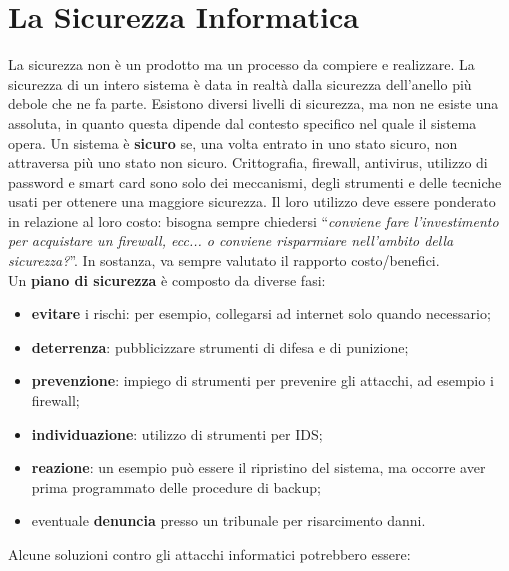\section{La Sicurezza Informatica}

La sicurezza non è un prodotto ma un processo da compiere e realizzare.
La sicurezza di un intero sistema è data in realtà dalla sicurezza dell'anello
più debole che ne fa parte. Esistono diversi livelli di sicurezza, ma non ne
esiste una assoluta, in quanto questa dipende dal contesto specifico nel quale
il sistema opera.
Un sistema è \textbf{sicuro} se, una volta entrato in uno stato sicuro, non
attraversa più uno stato non sicuro.
Crittografia, firewall, antivirus, utilizzo di password e smart card sono solo
dei meccanismi, degli strumenti e delle tecniche usati per ottenere una maggiore
sicurezza. Il loro utilizzo deve essere ponderato in relazione al loro costo:
bisogna sempre chiedersi ``\textit{conviene fare l'investimento per acquistare un firewall,
      ecc... o conviene risparmiare nell'ambito della sicurezza?}''. In sostanza, va
sempre valutato il rapporto costo/benefici.\\

Un \textbf{piano di sicurezza} è composto da diverse fasi:

\begin{itemize}
      \item \textbf{evitare} i rischi: per esempio, collegarsi ad internet
            solo quando necessario;
      \item \textbf{deterrenza}: pubblicizzare strumenti di difesa e di punizione;
      \item \textbf{prevenzione}: impiego di strumenti per prevenire gli attacchi,
            ad esempio i firewall;
      \item \textbf{individuazione}: utilizzo di strumenti per IDS;
      \item \textbf{reazione}: un esempio può essere il ripristino del sistema,
            ma occorre aver prima programmato delle procedure di backup;
      \item eventuale \textbf{denuncia} presso un tribunale per risarcimento danni.
\end{itemize}

Alcune soluzioni contro gli attacchi informatici potrebbero essere:

